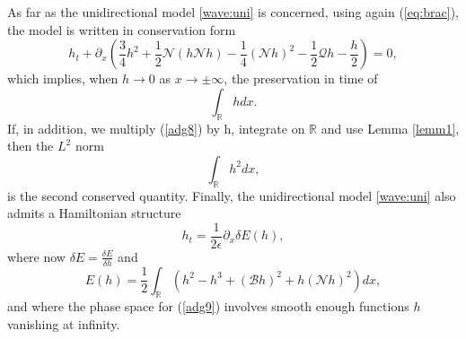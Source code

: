 \documentclass[final,11pt,a4paper,reqno]{amsart}
\newcommand{\RR}{\mathbb R}
\theoremstyle{definition}
\begin{document}
As far as the unidirectional model  \eqref{wave:uni} is concerned, using again (\ref{eq:brac}), the model is written in conservation form
\begin{equation}\label{adg8}
h_{t}+\partial_{x}\left(\frac{3}{4}h^{2}+\frac{1}{2}\mathscr{N}(h\mathscr{N}h)-\frac{1}{4}(\mathscr{N}h)^{2}-\frac{1}{2}\mathscr{Q}h-\frac{h}{2}\right)=0,
\end{equation}
which implies, when $h\rightarrow 0$ as $x\rightarrow\pm\infty$, the preservation in time of
$$\int_{\mathbb{R}}hdx.$$ If, in addition, we multiply (\ref{adg8}) by h, integrate on $\mathbb{R}$ and use Lemma \ref{lemm1}, then the $L^{2}$ norm
$$\int_{\mathbb{R}}h^{2}dx,$$ is the second conserved quantity. Finally, 
the unidirectional model  \eqref{wave:uni}
also admits a Hamiltonian structure
\begin{equation*}
h_{t}=\frac{1}{2\epsilon}\partial_{x}\delta E(h),
\end{equation*}
where now $\delta E=\frac{\delta E}{\delta h}$ and
\begin{equation}\label{adg9}
E(h)=\frac{1}{2}\int_{\RR}\left(h^{2}-h^{3}+(\mathscr{B}h)^{2}+h(\mathscr{N}h)^{2}\right)dx,
\end{equation}
and where the phase space for (\ref{adg9}) involves smooth enough functions $h$ vanishing at infinity.
\end{document}
